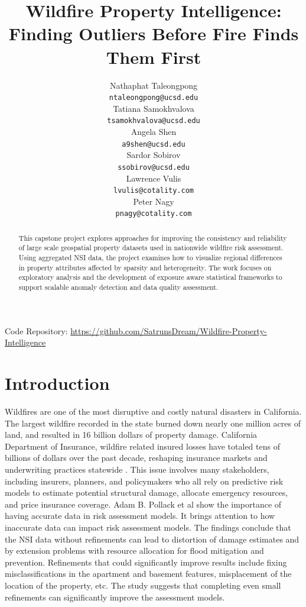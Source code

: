 \documentclass[11pt,letterpaper]{article}
\title{Wildfire Property Intelligence:\\ \vspace{0.3em}
Finding Outliers Before Fire Finds Them First}
\author{Nathaphat Taleongpong\\
  {\tt ntaleongpong@ucsd.edu}\\\And
  Tatiana Samokhvalova\\
  {\tt tsamokhvalova@ucsd.edu} \\\And
  Angela Shen\\
  {\tt a9shen@ucsd.edu} \\\And
  Sardor Sobirov\\
  {\tt ssobirov@ucsd.edu} \\\And
  Lawrence Vulis\\
  {\tt lvulis@cotality.com} \\\And
  Peter Nagy\\
  {\tt pnagy@cotality.com}}
\begin{document}
\maketitle


\begin{abstract}
This capstone project explores approaches for improving the consistency and reliability of large scale geospatial property datasets used in nationwide wildfire risk assessment. Using aggregated NSI data, the project examines how to visualize regional differences in property attributes affected by sparsity and heterogeneity. The work focuses on exploratory analysis and the development of exposure aware statistical frameworks to support scalable anomaly detection and data quality assessment.
\end{abstract}

\begin{center}
Code Repository: \url{https://github.com/SatrunsDream/Wildfire-Property-Intelligence} \\
\end{center}

\maketoc
\clearpage


\section{Introduction}


Wildfires are one of the most disruptive and costly natural disasters in California. The largest wildfire recorded in the state burned down nearly one million acres of land, and resulted in 16 billion dollars of property damage. California Department of Insurance, wildfire related insured losses have totaled tens of billions of dollars over the past decade, reshaping insurance markets and underwriting practices statewide \citep{calfire_augustcomplex_2020}. This issue involves many stakeholders, including insurers, planners, and policymakers who all rely on predictive risk models to estimate potential structural damage, allocate emergency resources, and price insurance coverage. Adam B. Pollack et al \citep{pollacknsi} show the importance of having accurate data in risk assessment models. It brings attention to how inaccurate data can impact risk assessment models. The findings conclude that the NSI data without refinements can lead to distortion of damage estimates and by extension problems with resource allocation for flood mitigation and prevention. Refinements that could significantly improve results include fixing misclassifications in the apartment and basement features, misplacement of the location of the property, etc. The study suggests that completing even small refinements can significantly improve the assessment models.
\end{document}
